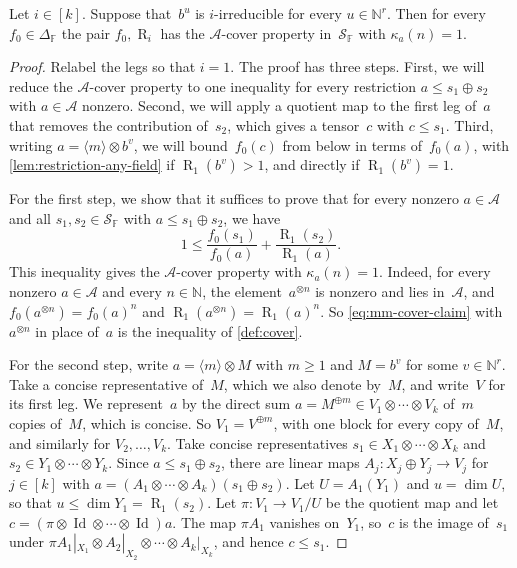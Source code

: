 \documentclass[11pt,letterpaper]{article}
\DeclareMathOperator{\tensorrank}{R}
\newcommand{\FF}{\mathbb{F}}
\newcommand{\NN}{\mathbb{N}}
\DeclareMathOperator{\Id}{Id}
\begin{document}
\begin{lemma}\label{lem:mm-cover}
Let $i \in [k]$. Suppose that~$b^u$ is $i$-irreducible for every $u \in \NN^r$. Then for every $f_0 \in \Delta_\FF$ the pair $f_0, \tensorrank_i$ has the $\mathcal{A}$-cover property in~$\mathcal{S}_\FF$ with $\kappa_a(n) = 1$.
\end{lemma}
\begin{proof}
Relabel the legs so that $i = 1$. The proof has three steps. First, we will reduce the $\mathcal{A}$-cover property to one inequality for every restriction $a \leq s_1 \oplus s_2$ with $a \in \mathcal{A}$ nonzero. Second, we will apply a quotient map to the first leg of~$a$ that removes the contribution of~$s_2$, which gives a tensor~$c$ with $c \leq s_1$. Third, writing $a = \langle m \rangle \otimes b^v$, we will bound~$f_0(c)$ from below in terms of~$f_0(a)$, with \cref{lem:restriction-any-field} if $\tensorrank_1(b^v) > 1$, and directly if $\tensorrank_1(b^v) = 1$.

For the first step, we show that it suffices to prove that for every nonzero $a \in \mathcal{A}$ and all $s_1, s_2 \in \mathcal{S}_\FF$ with $a \leq s_1 \oplus s_2$, we have
\begin{equation}\label{eq:mm-cover-claim}
1 \leq \frac{f_0(s_1)}{f_0(a)} + \frac{\tensorrank_1(s_2)}{\tensorrank_1(a)}.
\end{equation}
This inequality gives the $\mathcal{A}$-cover property with $\kappa_a(n) = 1$. Indeed, for every nonzero $a \in \mathcal{A}$ and every $n \in \NN$, the element~$a^{\otimes n}$ is nonzero and lies in~$\mathcal{A}$, and $f_0(a^{\otimes n}) = f_0(a)^n$ and $\tensorrank_1(a^{\otimes n}) = \tensorrank_1(a)^n$. So \eqref{eq:mm-cover-claim} with~$a^{\otimes n}$ in place of~$a$ is the inequality of \cref{def:cover}.

For the second step, write $a = \langle m \rangle \otimes M$ with $m \geq 1$ and $M = b^v$ for some $v \in \NN^r$. Take a concise representative of~$M$, which we also denote by~$M$, and write~$V$ for its first leg. We represent~$a$ by the direct sum $a = M^{\oplus m} \in V_1 \otimes \cdots \otimes V_k$ of~$m$ copies of~$M$, which is concise. So $V_1 = V^{\oplus m}$, with one block for every copy of~$M$, and similarly for $V_2, \ldots, V_k$. Take concise representatives $s_1 \in X_1 \otimes \cdots \otimes X_k$ and $s_2 \in Y_1 \otimes \cdots \otimes Y_k$. Since $a \leq s_1 \oplus s_2$, there are linear maps $A_j : X_j \oplus Y_j \to V_j$ for $j \in [k]$ with $a = (A_1 \otimes \cdots \otimes A_k)(s_1 \oplus s_2)$. Let $U = A_1(Y_1)$ and $u = \dim U$, so that $u \leq \dim Y_1 = \tensorrank_1(s_2)$. Let $\pi : V_1 \to V_1/U$ be the quotient map and let $c = (\pi \otimes \Id \otimes \cdots \otimes \Id)a$. The map $\pi A_1$ vanishes on~$Y_1$, so~$c$ is the image of~$s_1$ under $\pi A_1|_{X_1} \otimes A_2|_{X_2} \otimes \cdots \otimes A_k|_{X_k}$, and hence $c \leq s_1$.


\end{proof}
\end{document}
